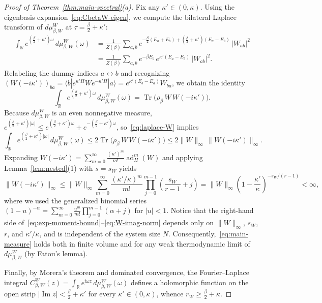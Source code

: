 \documentclass[11pt,a4paper]{article}
\numberwithin{equation}{section}
\theoremstyle{plain}
\theoremstyle{definition}
\newcommand{\Tr}{\operatorname{Tr}}
\newcommand{\ad}{\operatorname{ad}}
\begin{document}
\begin{proof}[Proof of Theorem~\ref{thm:main-spectral}(a)]
Fix any $\kappa'\in(0,\kappa)$. Using the eigenbasis expansion~\eqref{eq:CbetaW-eigen}, we compute the bilateral Laplace transform of $d\mu_{\beta,W}^W$ at $\tau = \frac{\beta}{2}+\kappa'$:
\begin{align*}
  \int_{\mathbb{R}} e^{(\frac{\beta}{2}+\kappa')\omega}\,d\mu_{\beta,W}^W(\omega)
  &= \frac{1}{Z(\beta)}\sum_{a,b} e^{-\frac{\beta}{2}(E_a+E_b) + (\frac{\beta}{2}+\kappa')(E_a-E_b)}\,|W_{ab}|^2 \\
  &= \frac{1}{Z(\beta)}\sum_{a,b} e^{-\beta E_b}\,e^{\kappa'(E_a-E_b)}\,|W_{ab}|^2.
\end{align*}
Relabeling the dummy indices $a\leftrightarrow b$ and recognizing $(W(-i\kappa'))_{ba} = \langle b|e^{\kappa' H} W e^{-\kappa' H}|a\rangle = e^{\kappa'(E_b-E_a)}W_{ba}$, we obtain the identity
\begin{equation}\label{eq:laplace-W}
  \int_{\mathbb{R}} e^{(\frac{\beta}{2}+\kappa')\omega}\,d\mu_{\beta,W}^W(\omega)
  = \Tr\!\bigl(\rho_\beta\,W\,W(-i\kappa')\bigr).
\end{equation}
Because $d\mu_{\beta,W}^W$ is an even nonnegative measure, $e^{(\frac{\beta}{2}+\kappa')|\omega|} \le e^{(\frac{\beta}{2}+\kappa')\omega} + e^{-(\frac{\beta}{2}+\kappa')\omega}$, so~\eqref{eq:laplace-W} implies
\begin{equation}\label{eq:exp-moment-bound}
  \int_{\mathbb{R}} e^{(\frac{\beta}{2}+\kappa')|\omega|}\,d\mu_{\beta,W}^W(\omega)
  \le 2\Tr\!\bigl(\rho_\beta\,W\,W(-i\kappa')\bigr)
  \le 2\|W\|_\infty\,\|W(-i\kappa')\|_\infty.
\end{equation}
Expanding $W(-i\kappa') = \sum_{m=0}^\infty \frac{(\kappa')^m}{m!}\ad_H^m(W)$ and applying Lemma~\ref{lem:nested}(1) with $s = s_W$ yields
\begin{equation}\label{eq:W-imag-norm}
  \|W(-i\kappa')\|_\infty
  \le \|W\|_\infty \sum_{m=0}^\infty \frac{(\kappa'/\kappa)^m}{m!}\prod_{j=0}^{m-1}\left(\frac{s_W}{r-1}+j\right)
  = \|W\|_\infty \left(1 - \frac{\kappa'}{\kappa}\right)^{-s_W/(r-1)} < \infty,
\end{equation}
where we used the generalized binomial series $(1-u)^{-\alpha} = \sum_{m=0}^\infty \frac{u^m}{m!}\prod_{j=0}^{m-1}(\alpha+j)$ for $|u|<1$. Notice that the right-hand side of~\eqref{eq:exp-moment-bound}--\eqref{eq:W-imag-norm} depends only on $\|W\|_\infty$, $s_W$, $r$, and $\kappa'/\kappa$, and is independent of the system size $N$. Consequently,~\eqref{eq:main-measure} holds both in finite volume and for any weak thermodynamic limit of $d\mu_{\beta,W}^W$ (by Fatou's lemma).

Finally, by Morera's theorem and dominated convergence, the Fourier--Laplace integral $C_{\beta,W}^W(z) = \int_{\mathbb{R}} e^{i\omega z}\,d\mu_{\beta,W}^W(\omega)$ defines a holomorphic function on the open strip $|\operatorname{Im}z| < \frac{\beta}{2}+\kappa'$ for every $\kappa'\in(0,\kappa)$, whence $r_W \ge \frac{\beta}{2}+\kappa$.
\end{proof}
\end{document}
